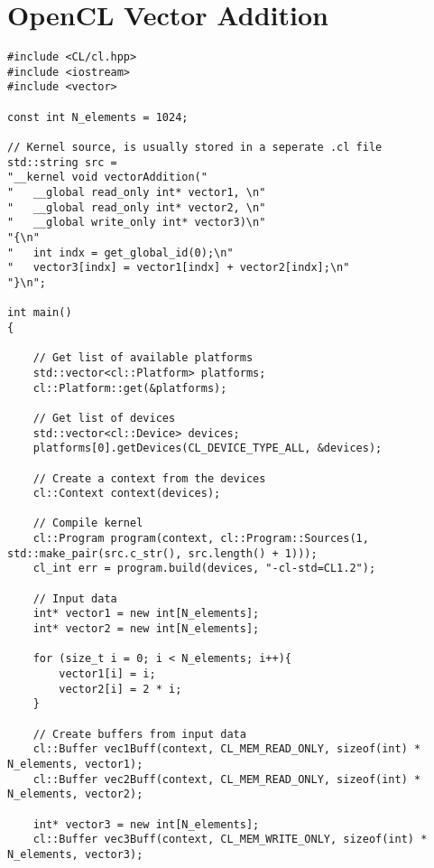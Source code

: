 
\chapter{OpenCL Vector Addition} \label{appendix:OpenCLVecAdd}

\begin{lstlisting}
#include <CL/cl.hpp>
#include <iostream>
#include <vector>

const int N_elements = 1024;

// Kernel source, is usually stored in a seperate .cl file
std::string src = 
"__kernel void vectorAddition("
"	__global read_only int* vector1, \n"
"	__global read_only int* vector2, \n"
"	__global write_only int* vector3)\n"
"{\n"
"	int indx = get_global_id(0);\n"
"	vector3[indx] = vector1[indx] + vector2[indx];\n"
"}\n";

int main()
{

	// Get list of available platforms
	std::vector<cl::Platform> platforms;
	cl::Platform::get(&platforms);

	// Get list of devices
	std::vector<cl::Device> devices;
	platforms[0].getDevices(CL_DEVICE_TYPE_ALL, &devices);

	// Create a context from the devices
	cl::Context context(devices);

	// Compile kernel
	cl::Program program(context, cl::Program::Sources(1, std::make_pair(src.c_str(), src.length() + 1)));
	cl_int err = program.build(devices, "-cl-std=CL1.2");

	// Input data
	int* vector1 = new int[N_elements];
	int* vector2 = new int[N_elements];

	for (size_t i = 0; i < N_elements; i++){
		vector1[i] = i;
		vector2[i] = 2 * i;
	}

	// Create buffers from input data
	cl::Buffer vec1Buff(context, CL_MEM_READ_ONLY, sizeof(int) * N_elements, vector1);
	cl::Buffer vec2Buff(context, CL_MEM_READ_ONLY, sizeof(int) * N_elements, vector2);

	int* vector3 = new int[N_elements];
	cl::Buffer vec3Buff(context, CL_MEM_WRITE_ONLY, sizeof(int) * N_elements, vector3);


\end{lstlisting}

